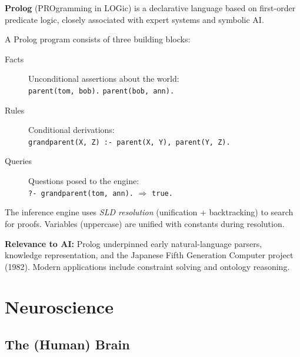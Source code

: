     \begin{tcbitemize}[ skin=sectionraster ]
        \tcbitem[title={Prolog: Logic Programming Basics}, raster multicolumn=6]
        \textbf{Prolog} (PROgramming in LOGic) is a declarative language based on first-order predicate logic, closely associated with expert systems and symbolic AI.

        A Prolog program consists of three building blocks:
        \begin{description}
            \item[Facts] Unconditional assertions about the world:\\
                \texttt{parent(tom, bob).} \quad \texttt{parent(bob, ann).}
            \item[Rules] Conditional derivations:\\
                \texttt{grandparent(X, Z) :- parent(X, Y), parent(Y, Z).}
            \item[Queries] Questions posed to the engine:\\
                \texttt{?- grandparent(tom, ann).} \; $\Rightarrow$ \texttt{true.}
        \end{description}

        The inference engine uses \emph{SLD resolution} (unification + backtracking) to search for proofs. Variables (uppercase) are unified with constants during resolution.

        \textbf{Relevance to AI:} Prolog underpinned early natural-language parsers, knowledge representation, and the Japanese Fifth Generation Computer project (1982). Modern applications include constraint solving and ontology reasoning.
    \end{tcbitemize}

    \section{Neuroscience}
    \subsection{The (Human) Brain}

